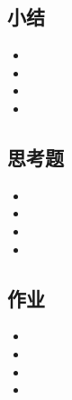 \documentclass{article}
\begin{document}
\begin{CJK}{UTF8}{gkai}
\subsection{}

\subsection{小结}
\begin{itemize}
\item
\item
\item
\item 
\end{itemize}

\subsection{思考题}
\begin{itemize}
\item
\item
\item
\item 
\end{itemize}

\subsection{作业}
\begin{itemize}
\item
\item
\item
\item 
\end{itemize}


\end{CJK}
\end{document}
